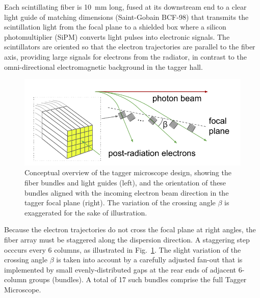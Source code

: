Each scintillating fiber is 10~mm long, fused at its downstream end to
a clear light guide of matching dimensions (Saint-Gobain BCF-98) that
transmits the scintillation light from the focal plane to a shielded box where
a silicon photomultiplier (SiPM) converts light pulses into electronic signals. The
scintillators are oriented so that the electron trajectories are parallel to the
fiber axis, providing large signals for electrons from the radiator, in contrast
to the omni-directional electromagnetic background in the tagger hall.

\begin{figure}[tbh]
\begin{center}
 \includegraphics[clip=true,width=0.95\linewidth]{figures/TAGM_conceptual.pdf}
\end{center}
\caption{
Conceptual overview of the tagger microscope design, showing the fiber bundles and
light guides (left), and the orientation of these bundles aligned with the incoming
electron beam direction in the tagger focal plane (right). The variation of the
crossing angle $\beta$ is exaggerated for the sake of illustration.
        }
\label{fig:TAGM_conceptual}
\end{figure}

Because the electron trajectories do not cross the focal plane at right angles, the
fiber array must be staggered along the dispersion direction. A staggering step
occcurs every 6 columns, as illustrated in Fig.~\ref{fig:TAGM_conceptual}. The slight
variation of the crossing angle $\beta$ is taken into account by a carefully adjusted
fan-out that is implemented by small evenly-distributed gaps at the rear ends of 
adjacent 6-column groups (bundles). A total of 17 such bundles comprise the full
Tagger Microscope.

